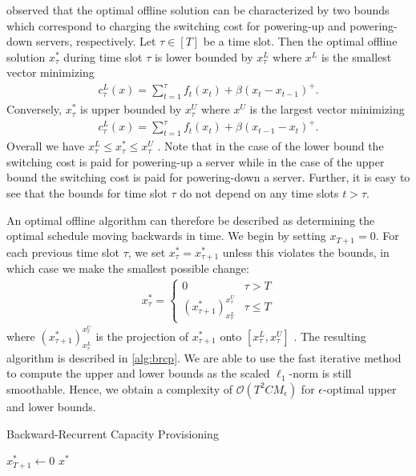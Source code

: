\citeauthor*{Lin2011} observed that the optimal offline solution can be characterized by two bounds which correspond to charging the switching cost for powering-up and powering-down servers, respectively. Let $\tau \in [T]$ be a time slot. Then the optimal offline solution $x_{\tau}^*$ during time slot $\tau$ is lower bounded by $x_{\tau}^L$ where $x^L$ is the smallest vector minimizing \begin{align*}
    c_{\tau}^L(x) = \sum_{t=1}^{\tau} f_t(x_t) + \beta (x_t - x_{t-1})^+.
\end{align*} Conversely, $x_{\tau}^*$ is upper bounded by $x_{\tau}^U$ where $x^U$ is the largest vector minimizing \begin{align*}
    c_{\tau}^L(x) = \sum_{t=1}^{\tau} f_t(x_t) + \beta (x_{t-1} - x_t)^+.
\end{align*} Overall we have $x_{\tau}^L \leq x_{\tau}^* \leq x_{\tau}^U$ \cite{Lin2011}. Note that in the case of the lower bound the switching cost is paid for powering-up a server while in the case of the upper bound the switching cost is paid for powering-down a server. Further, it is easy to see that the bounds for time slot $\tau$ do not depend on any time slots $t > \tau$.

An optimal offline algorithm can therefore be described as determining the optimal schedule moving backwards in time. We begin by setting $x_{T+1} = 0$. For each previous time slot $\tau$, we set $x_{\tau}^* = x_{\tau + 1}^*$ unless this violates the bounds, in which case we make the smallest possible change: \begin{align*}
    x_{\tau}^* = \begin{cases}
        0 & \tau > T \\
        (x_{\tau+1}^*)_{x_{\tau}^L}^{x_{\tau}^U} & \tau \leq T
    \end{cases}
\end{align*} where $(x_{\tau+1}^*)_{x_{\tau}^L}^{x_{\tau}^U}$ is the projection of $x_{\tau+1}^*$ onto $[x_{\tau}^L, x_{\tau}^U]$ \cite{Lin2011}. The resulting algorithm is described in \autoref{alg:brcp}. We are able to use the fast iterative method to compute the upper and lower bounds as the scaled $\ell_1$-norm is still smoothable. Hence, we obtain a complexity of $\mathcal{O}(T^2 C M_{\epsilon})$ for $\epsilon$-optimal upper and lower bounds.

\begin{algorithm}
    \caption{Backward-Recurrent Capacity Provisioning \cite{Lin2011}}\label{alg:brcp}
    $x_{T+1}^* \gets 0$\;
    \Return $x^*$\;
\end{algorithm}

